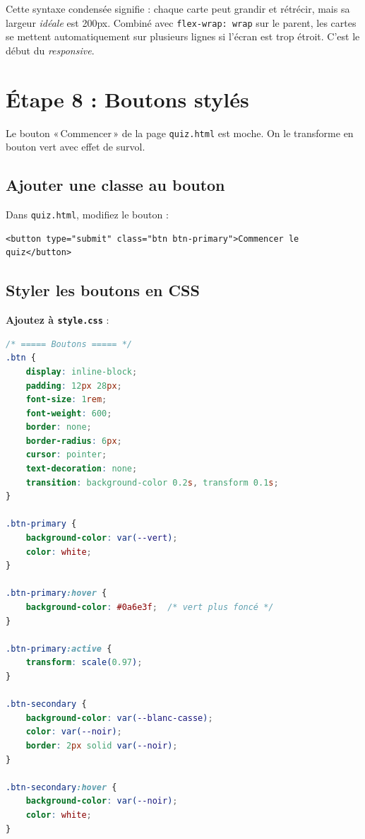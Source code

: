 \documentclass[11pt,a4paper]{article}
\begin{document}
\begin{infobox}
Cette syntaxe condensée signifie : \og{}chaque carte peut grandir et
rétrécir, mais sa largeur \emph{idéale} est 200px\fg{}. Combiné avec
\texttt{flex-wrap: wrap} sur le parent, les cartes se mettent
automatiquement sur plusieurs lignes si l'écran est trop étroit. C'est
le début du \emph{responsive}.
\end{infobox}

\newpage

\section{Étape 8 : Boutons stylés}

Le bouton «\,Commencer\,» de la page \texttt{quiz.html} est moche. On
le transforme en bouton vert avec effet de survol.

\subsection{Ajouter une classe au bouton}

Dans \texttt{quiz.html}, modifiez le bouton :

\begin{lstlisting}[language=HTML5]
<button type="submit" class="btn btn-primary">Commencer le quiz</button>
\end{lstlisting}

\subsection{Styler les boutons en CSS}

\textbf{Ajoutez à \texttt{style.css}} :

\begin{lstlisting}[language=CSS]
/* ===== Boutons ===== */
.btn {
    display: inline-block;
    padding: 12px 28px;
    font-size: 1rem;
    font-weight: 600;
    border: none;
    border-radius: 6px;
    cursor: pointer;
    text-decoration: none;
    transition: background-color 0.2s, transform 0.1s;
}

.btn-primary {
    background-color: var(--vert);
    color: white;
}

.btn-primary:hover {
    background-color: #0a6e3f;  /* vert plus foncé */
}

.btn-primary:active {
    transform: scale(0.97);
}

.btn-secondary {
    background-color: var(--blanc-casse);
    color: var(--noir);
    border: 2px solid var(--noir);
}

.btn-secondary:hover {
    background-color: var(--noir);
    color: white;
}
\end{lstlisting}
\end{document}
